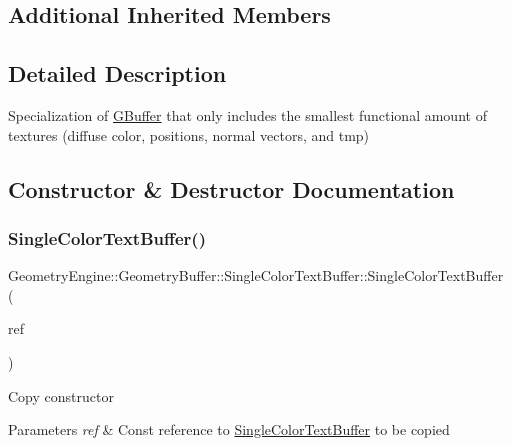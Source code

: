 \subsection*{Additional Inherited Members}


\subsection{Detailed Description}
Specialization of \mbox{\hyperlink{class_geometry_engine_1_1_geometry_buffer_1_1_g_buffer}{G\+Buffer}} that only includes the smallest functional amount of textures (diffuse color, positions, normal vectors, and tmp) 

\subsection{Constructor \& Destructor Documentation}
\mbox{\label{class_geometry_engine_1_1_geometry_buffer_1_1_single_color_text_buffer_ad0e30e16f3630ecf9ca654688b964067}} 
\subsubsection{\texorpdfstring{SingleColorTextBuffer()}{SingleColorTextBuffer()}}
{\footnotesize\ttfamily Geometry\+Engine\+::\+Geometry\+Buffer\+::\+Single\+Color\+Text\+Buffer\+::\+Single\+Color\+Text\+Buffer (\begin{DoxyParamCaption}\item[{const \mbox{\hyperlink{class_geometry_engine_1_1_geometry_buffer_1_1_single_color_text_buffer}{Single\+Color\+Text\+Buffer}} \&}]{ref }\end{DoxyParamCaption})}

Copy constructor 
\begin{DoxyParams}{Parameters}
{\em ref} & Const reference to \mbox{\hyperlink{class_geometry_engine_1_1_geometry_buffer_1_1_single_color_text_buffer}{Single\+Color\+Text\+Buffer}} to be copied \\
\hline
\end{DoxyParams}


